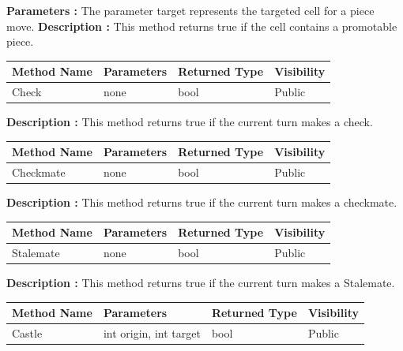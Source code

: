 \documentclass[12pt]{article}
\begin{document}
\textbf{Parameters :} The parameter target represents the targeted cell for a piece move.
\textbf{Description :} This method returns true if the cell contains a promotable piece.

\begin{table}[H]
    \begin{tabular}{|l|l|l|l|}
    \hline
    \rowcolor[HTML]{EFEFEF} 
    \cellcolor[HTML]{EFEFEF}\textbf{Method Name} & \textbf{Parameters}     & \textbf{Returned Type} & \textbf{Visibility} \\ \hline
    Check                                        & none                    & bool                   & Public              \\ \hline
    \end{tabular}
\end{table}

\textbf{Description :} This method returns true if the current turn makes a check.

\begin{table}[H]
    \begin{tabular}{|l|l|l|l|}
    \hline
    \rowcolor[HTML]{EFEFEF} 
    \cellcolor[HTML]{EFEFEF}\textbf{Method Name} & \textbf{Parameters}     & \textbf{Returned Type} & \textbf{Visibility} \\ \hline
    Checkmate                                        & none                    & bool                   & Public              \\ \hline
    \end{tabular}
\end{table}

\textbf{Description :} This method returns true if the current turn makes a checkmate.

\begin{table}[H]
    \begin{tabular}{|l|l|l|l|}
    \hline
    \rowcolor[HTML]{EFEFEF} 
    \cellcolor[HTML]{EFEFEF}\textbf{Method Name} & \textbf{Parameters}     & \textbf{Returned Type} & \textbf{Visibility} \\ \hline
    Stalemate                                    & none                    & bool                   & Public              \\ \hline
    \end{tabular}
\end{table}

\textbf{Description :} This method returns true if the current turn makes a Stalemate.

\begin{table}[H]
    \begin{tabular}{|l|l|l|l|}
    \hline
    \rowcolor[HTML]{EFEFEF} 
    \cellcolor[HTML]{EFEFEF}\textbf{Method Name} & \textbf{Parameters}      & \textbf{Returned Type} & \textbf{Visibility} \\ \hline
    Castle                                       & int origin, int target   & bool                   & Public              \\ \hline
    \end{tabular}
\end{table}
\end{document}
